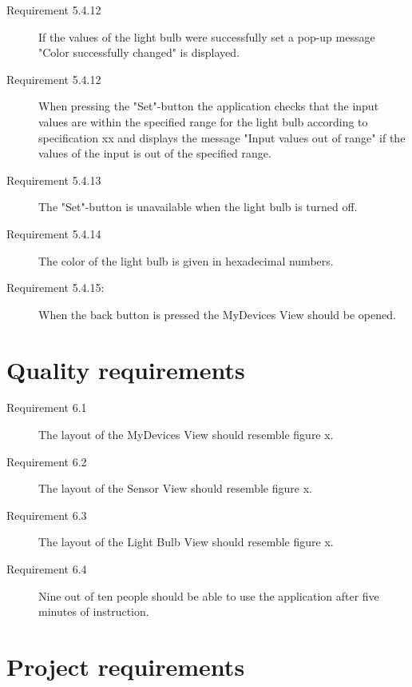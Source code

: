 \documentclass[a4paper]{article}
\begin{document}
\begin{description}
\item[Requirement 5.4.12] If the values of the light bulb were successfully set a pop-up message "Color successfully changed" is displayed.

\item[Requirement 5.4.12] When pressing the "Set"-button the application checks that the input values are within the specified range for the light bulb according to specification xx and displays the message "Input values out of range" if the values of the input is out of the specified range.

\item[Requirement 5.4.13] The "Set"-button is unavailable when the light bulb is turned off.

\item[Requirement 5.4.14] The color of the light bulb is given in hexadecimal numbers.

\item[Requirement 5.4.15:] When the back button is pressed the MyDevices View should be opened.

\end{description}

\section{Quality requirements}

\begin{description}
\item[Requirement 6.1] The layout of the MyDevices View should resemble figure x.
\item[Requirement 6.2] The layout of the Sensor View should resemble figure x.
\item[Requirement 6.3] The layout of the Light Bulb View should resemble figure x.
\item[Requirement 6.4] Nine out of ten people should be able to use the application after five minutes of instruction. 

\end{description}


\section{Project requirements}
\end{document}
